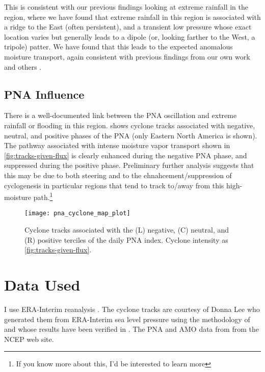 \documentclass[12pt]{article}
\begin{document}
This is consistent with our previous findings looking at extreme rainfall in the region, where we have found that extreme rainfall in this region is associated with a ridge to the East (often persistent), and a transient low pressure whose exact location varies but generally leads to a dipole (or, looking farther to the West, a tripole) patter.
We have found that this leads to the expected anomalous moisture transport, again consistent with previous findings from our own work and others \citep{Nakamura2012,Lavers2013a,Steinschneider2016a}.


\subsection{PNA Influence}

There is a well-documented \citep[ie][]{Nakamura2012,Robertson2015,Steinschneider2015a} link between the PNA oscillation and extreme rainfall or flooding in this region.
 shows cyclone tracks associated with negative, neutral, and positive phases of the PNA (only Eastern North America is shown).
The pathway associated with intense moisture vapor transport shown in \cref{fig:tracks-given-flux} is clearly enhanced during the negative PNA phase, and suppressed during the positive phase.
Preliminary further analysis suggests that this may be due to both steering and to the ehnahcement/suppression of cyclogenesis in particular regions that tend to track to/away from this high-moisture path.\footnote{If you know more about this, I'd be interested to learn more}

\begin{figure}
    \centering
    \texttt{[image: pna\_cyclone\_map\_plot]}
    \caption{Cyclone tracks associated with the (L) negative, (C) neutral, and (R) positive terciles of the daily PNA index.  Cyclone intensity as \cref{fig:tracks-given-flux}.}
    \label{fig:tracks-given-pna}
\end{figure}

\section{Data Used}

I use ERA-Interim reanalysis \citep{Dee2011}.
The cyclone tracks are courtesy of Donna Lee who generated them from ERA-Interim sea level pressure using the methodology of \citet{Hodges1994} and whose results have been verified in \cite{Booth2015}.
The PNA and AMO data from from the NCEP web site.
\end{document}
